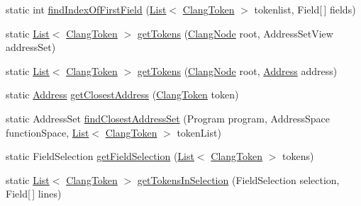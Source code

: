 \begin{DoxyCompactItemize}
\item 
static int \mbox{\hyperlink{classghidra_1_1app_1_1decompiler_1_1component_1_1_decompiler_utils_ae6bf8e2f218a0398cb90ce2826f16904}{find\+Index\+Of\+First\+Field}} (\mbox{\hyperlink{xml_8hh_ab5ab62f46b3735557c125f91b40ac155}{List}}$<$ \mbox{\hyperlink{classghidra_1_1app_1_1decompiler_1_1_clang_token}{Clang\+Token}} $>$ tokenlist, Field\mbox{[}$\,$\mbox{]} fields)
\item 
static \mbox{\hyperlink{xml_8hh_ab5ab62f46b3735557c125f91b40ac155}{List}}$<$ \mbox{\hyperlink{classghidra_1_1app_1_1decompiler_1_1_clang_token}{Clang\+Token}} $>$ \mbox{\hyperlink{classghidra_1_1app_1_1decompiler_1_1component_1_1_decompiler_utils_af2e187292506b0eb6ba118c18b49ee2e}{get\+Tokens}} (\mbox{\hyperlink{interfaceghidra_1_1app_1_1decompiler_1_1_clang_node}{Clang\+Node}} root, Address\+Set\+View address\+Set)
\item 
static \mbox{\hyperlink{xml_8hh_ab5ab62f46b3735557c125f91b40ac155}{List}}$<$ \mbox{\hyperlink{classghidra_1_1app_1_1decompiler_1_1_clang_token}{Clang\+Token}} $>$ \mbox{\hyperlink{classghidra_1_1app_1_1decompiler_1_1component_1_1_decompiler_utils_a7b59bfb76a7feee61f01f6c090f016a4}{get\+Tokens}} (\mbox{\hyperlink{interfaceghidra_1_1app_1_1decompiler_1_1_clang_node}{Clang\+Node}} root, \mbox{\hyperlink{class_address}{Address}} address)
\item 
static \mbox{\hyperlink{class_address}{Address}} \mbox{\hyperlink{classghidra_1_1app_1_1decompiler_1_1component_1_1_decompiler_utils_a84d80e9a65763f50e5b82c91dc8bfde9}{get\+Closest\+Address}} (\mbox{\hyperlink{classghidra_1_1app_1_1decompiler_1_1_clang_token}{Clang\+Token}} token)
\item 
static Address\+Set \mbox{\hyperlink{classghidra_1_1app_1_1decompiler_1_1component_1_1_decompiler_utils_ac1c3357b8ea5189690396dbde0caca60}{find\+Closest\+Address\+Set}} (Program program, Address\+Space function\+Space, \mbox{\hyperlink{xml_8hh_ab5ab62f46b3735557c125f91b40ac155}{List}}$<$ \mbox{\hyperlink{classghidra_1_1app_1_1decompiler_1_1_clang_token}{Clang\+Token}} $>$ token\+List)
\item 
static Field\+Selection \mbox{\hyperlink{classghidra_1_1app_1_1decompiler_1_1component_1_1_decompiler_utils_a20bf8c2ccfda617209d27aed13c1ca1f}{get\+Field\+Selection}} (\mbox{\hyperlink{xml_8hh_ab5ab62f46b3735557c125f91b40ac155}{List}}$<$ \mbox{\hyperlink{classghidra_1_1app_1_1decompiler_1_1_clang_token}{Clang\+Token}} $>$ tokens)
\item 
static \mbox{\hyperlink{xml_8hh_ab5ab62f46b3735557c125f91b40ac155}{List}}$<$ \mbox{\hyperlink{classghidra_1_1app_1_1decompiler_1_1_clang_token}{Clang\+Token}} $>$ \mbox{\hyperlink{classghidra_1_1app_1_1decompiler_1_1component_1_1_decompiler_utils_a9c0328f5ed2152cc93630a1fb5c37c90}{get\+Tokens\+In\+Selection}} (Field\+Selection selection, Field\mbox{[}$\,$\mbox{]} lines)

\end{DoxyCompactItemize}
